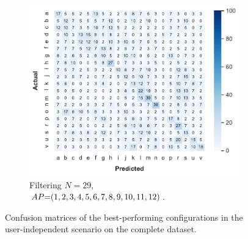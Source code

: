 \begin{figure}
\begin{subfigure}{.69\linewidth}
      \includegraphics[width=\linewidth]{Figures/RadarExperiments/Datasets/20Gestures/Results/All/UI-filtering-cm.pdf}
      \vspace{-12pt}
      \caption{Filtering $N{=}29$, \\ $\splitatcommas{AP{=}(1, 2, 3, 4, 5, 6, 7, 8, 9, 10, 11, 12)}$.}
      \label{fig:radar-experiments:confusion-exp1-UI-filtering}
  \end{subfigure}
  \caption{Confusion matrices of the best-performing configurations in the user-independent scenario on the complete dataset.}
  \label{fig:radar-experiments:confusion-exp1-UI}
  \vspace{-20pt}
\end{figure}

